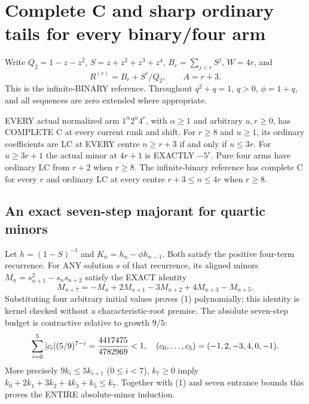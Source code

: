 \section{Complete C and sharp ordinary tails for every binary/four arm}
Write $Q_2=1-z-z^2$, $S=z+z^2+z^3+z^4$,
$B_r=\sum_{j<r}S^j$, $W=4r$, and
\[
 R^{(r)}=B_r+S^r/Q_2,\qquad A=r+3.
\]
This is the infinite-BINARY reference. Throughout $q^2+q=1$,
$q>0$, $\phi=1+q$, and all sequences are zero extended where appropriate.

\begin{theorem}
EVERY actual normalized arm $1^\alpha2^u4^r$, with
$\alpha\ge1$ and arbitrary $u,r\ge0$, has COMPLETE C at every
current rank and shift. For $r\ge8$ and $u\ge1$, its ordinary
coefficients are LC at EVERY centre $n\ge r+3$ if and only if
$u\le3r$. For $u\ge3r+1$ the actual minor at $4r+1$ is EXACTLY
$-5^r$. Pure four arms have ordinary LC from $r+2$ when $r\ge8$.
The infinite-binary reference has complete C for every $r$ and
ordinary LC at every centre $r+3\le n\le4r$ when $r\ge8$.
\end{theorem}

\subsection{An exact seven-step majorant for quartic minors}
Let $h=(1-S)^{-1}$ and $K_n=h_n-\phi h_{n-1}$. Both satisfy the
positive four-term recurrence. For ANY solution $s$ of that recurrence,
its aligned minors $M_n=s_{n+1}^2-s_ns_{n+2}$ satisfy the EXACT identity
\[
 M_{n+7}=-M_n+2M_{n+1}-3M_{n+2}+4M_{n+3}-M_{n+5}.       \tag{1}
\]
Substituting four arbitrary initial values proves (1) polynomially;
this identity is kernel checked without a characteristic-root premise.
The absolute seven-step budget is contractive relative to growth $9/5$:
\[
 \sum_{i=0}^5|c_i|(5/9)^{7-i}
 ={4417475\over4782969}<1,\quad(c_0,\ldots,c_5)=(-1,2,-3,4,0,-1).
\]
More precisely $9k_i\le5k_{i+1}$ ($0\le i<7$), $k_7\ge0$ imply
$k_0+2k_1+3k_2+4k_3+k_5\le k_7$. Together with (1) and seven
entrance bounds this proves the ENTIRE absolute-minor induction.

